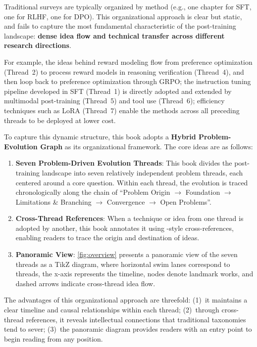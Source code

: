Traditional surveys are typically organized by method (e.g., one chapter for SFT, one for RLHF, one for DPO).
This organizational approach is clear but static, and fails to capture the most fundamental characteristic of the post-training landscape:
\textbf{dense idea flow and technical transfer across different research directions}.

For example, the ideas behind reward modeling flow from preference optimization (Thread~2)
to process reward models in reasoning verification (Thread~4),
and then loop back to preference optimization through GRPO;
the instruction tuning pipeline developed in SFT (Thread~1)
is directly adopted and extended by multimodal post-training (Thread~5) and tool use (Thread~6);
efficiency techniques such as LoRA (Thread~7) enable the methods across all preceding threads to be deployed at lower cost.

To capture this dynamic structure, this book adopts a \textbf{Hybrid Problem-Evolution Graph} as its organizational framework.
The core ideas are as follows:

\begin{enumerate}[leftmargin=2em]
  \item \textbf{Seven Problem-Driven Evolution Threads}:
    This book divides the post-training landscape into seven relatively independent problem threads,
    each centered around a core question.
    Within each thread, the evolution is traced chronologically along the chain of
    ``Problem Origin $\rightarrow$ Foundation $\rightarrow$ Limitations \& Branching $\rightarrow$ Convergence $\rightarrow$ Open Problems''.

  \item \textbf{Cross-Thread References}:
    When a technique or idea from one thread is adopted by another,
    this book annotates it using -style cross-references,
    enabling readers to trace the origin and destination of ideas.

  \item \textbf{Panoramic View}:
    \cref{fig:overview} presents a panoramic view of the seven threads as a TikZ diagram,
    where horizontal swim lanes correspond to threads, the x-axis represents the timeline,
    nodes denote landmark works, and dashed arrows indicate cross-thread idea flow.
\end{enumerate}

\noindent
The advantages of this organizational approach are threefold:
(1)~it maintains a clear timeline and causal relationships within each thread;
(2)~through cross-thread references, it reveals intellectual connections that traditional taxonomies tend to sever;
(3)~the panoramic diagram provides readers with an entry point to begin reading from any position.

